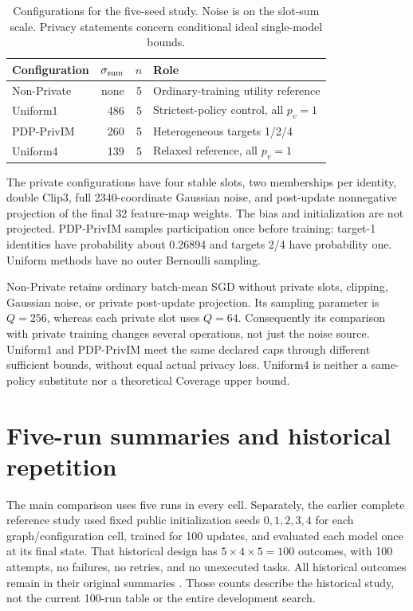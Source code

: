 \begin{table}[htbp]
\centering\small
\caption{Configurations for the five-seed study. Noise is on the slot-sum scale. Privacy statements concern conditional ideal single-model bounds.}\label{tab:config}
\begin{tabular}{lrrp{64mm}}\toprule
Configuration & $\sigma_{\rm sum}$ & $n$ & Role\\\midrule
Non-Private & none & 5 & Ordinary-training utility reference\\
Uniform1 & 486 & 5 & Strictest-policy control, all $p_v=1$\\
PDP-PrivIM & 260 & 5 & Heterogeneous targets 1/2/4\\
Uniform4 & 139 & 5 & Relaxed reference, all $p_v=1$\\\bottomrule
\end{tabular}
\end{table}

The private configurations have four stable slots, two memberships per identity, double Clip3, full 2340-coordinate Gaussian noise, and post-update nonnegative projection of the final 32 feature-map weights. The bias and initialization are not projected. PDP-PrivIM samples participation once before training: target-1 identities have probability about 0.26894 and targets 2/4 have probability one. Uniform methods have no outer Bernoulli sampling.

Non-Private retains ordinary batch-mean SGD without private slots, clipping, Gaussian noise, or private post-update projection. Its sampling parameter is $Q=256$, whereas each private slot uses $Q=64$. Consequently its comparison with private training changes several operations, not just the noise source. Uniform1 and PDP-PrivIM meet the same declared caps through different sufficient bounds, without equal actual privacy loss. Uniform4 is neither a same-policy substitute nor a theoretical Coverage upper bound.

\section{Five-run summaries and historical repetition}
The main comparison uses five runs in every cell. Separately, the earlier complete reference study used fixed public initialization seeds $0,1,2,3,4$ for each graph/configuration cell, trained for 100 updates, and evaluated each model once at its final state. That historical design has $5\times4\times5=100$ outcomes, with 100 attempts, no failures, no retries, and no unexecuted tasks. All historical outcomes remain in their original summaries \cite{projectdev}. Those counts describe the historical study, not the current 100-run table or the entire development search.

